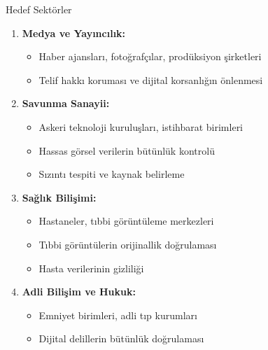 \documentclass[aspectratio=169,xcolor={dvipsnames}]{beamer}
\begin{document}
\begin{frame}{Hedef Sektörler}
\begin{enumerate}
\item \textbf{Medya ve Yayıncılık:}
\begin{itemize}
\item Haber ajansları, fotoğrafçılar, prodüksiyon şirketleri
\item Telif hakkı koruması ve dijital korsanlığın önlenmesi
\end{itemize}

\item \textbf{Savunma Sanayii:}
\begin{itemize}
\item Askeri teknoloji kuruluşları, istihbarat birimleri
\item Hassas görsel verilerin bütünlük kontrolü
\item Sızıntı tespiti ve kaynak belirleme
\end{itemize}

\item \textbf{Sağlık Bilişimi:}
\begin{itemize}
\item Hastaneler, tıbbi görüntüleme merkezleri
\item Tıbbi görüntülerin orijinallik doğrulaması
\item Hasta verilerinin gizliliği
\end{itemize}

\item \textbf{Adli Bilişim ve Hukuk:}
\begin{itemize}
\item Emniyet birimleri, adli tıp kurumları
\item Dijital delillerin bütünlük doğrulaması
\end{itemize}
\end{enumerate}
\end{frame}
\end{document}
